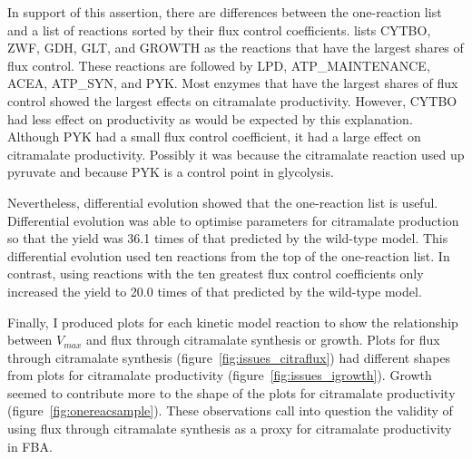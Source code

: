 \documentclass[parskip=full, numbers=noenddot]{scrreprt}
\begin{document}
In support of this assertion, there are differences between the one-reaction list and a list of reactions sorted by their flux control coefficients.
\citet{millard_metabolic_2017} lists CYTBO, ZWF, GDH, GLT, and GROWTH as the reactions that have the largest shares of flux control. These reactions are followed by LPD, ATP\_MAINTENANCE, ACEA, ATP\_SYN, and PYK. Most enzymes that have the largest shares of flux control showed the largest effects on citramalate productivity. However, CYTBO had less effect on productivity as would be expected by this explanation. Although PYK had a small flux control coefficient, it had a large effect on citramalate productivity. Possibly it was because the citramalate reaction used up pyruvate and because PYK is a control point in glycolysis.

Nevertheless, differential evolution showed that the one-reaction list is useful.
Differential evolution was able to optimise parameters for citramalate production so that the yield was 36.1 times of that predicted by the wild-type model. This differential evolution used ten reactions from the top of the one-reaction list. In contrast, using reactions with the ten greatest flux control coefficients only increased the yield to 20.0 times of that predicted by the wild-type model.

Finally, I produced plots for each kinetic model reaction to show the relationship between $V_{max}$ and flux through citramalate synthesis or growth.
Plots for flux through citramalate synthesis (figure~\ref{fig:issues_citraflux}) had different shapes from plots for citramalate productivity (figure~\ref{fig:issues_igrowth}). Growth seemed to contribute more to the shape of the plots for citramalate productivity (figure~\ref{fig:onereacsample}). These observations call into question the validity of using flux through citramalate synthesis as a proxy for citramalate productivity in FBA.
\end{document}

